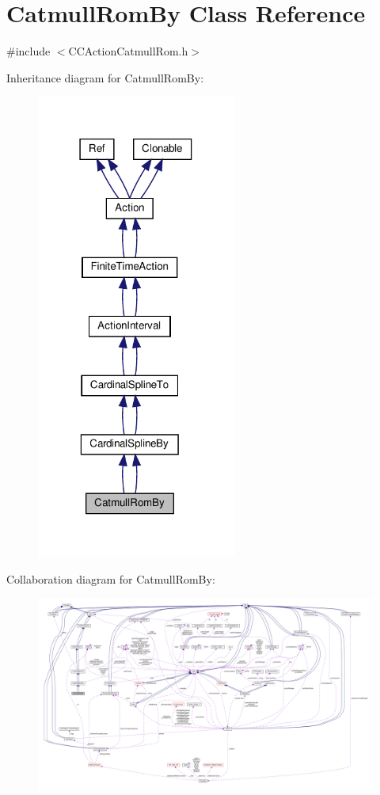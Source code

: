 \hypertarget{classCatmullRomBy}{}\section{Catmull\+Rom\+By Class Reference}
\label{classCatmullRomBy}


{\ttfamily \#include $<$C\+C\+Action\+Catmull\+Rom.\+h$>$}



Inheritance diagram for Catmull\+Rom\+By\+:
\nopagebreak
\begin{figure}[H]
\begin{center}
\leavevmode
\includegraphics[width=186pt]{classCatmullRomBy__inherit__graph}
\end{center}
\end{figure}


Collaboration diagram for Catmull\+Rom\+By\+:
\nopagebreak
\begin{figure}[H]
\begin{center}
\leavevmode
\includegraphics[width=350pt]{classCatmullRomBy__coll__graph}
\end{center}
\end{figure}
